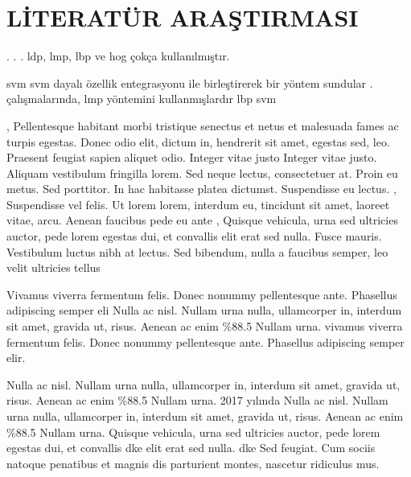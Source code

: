 \chapter{LİTERATÜR ARAŞTIRMASI}

\lipsum[6]
\parencite{shanvd2005}. 
\lipsum[7] 
\parencite{Zhaopaper}. 
\lipsum[5]
\parencite{he_chen}. 
\lipsum[8]
\acrfull{ldp}, \acrfull{lmp}, \acrfull{lbp} ve \acrfull{hog} çokça kullanılmıştır.

\parencite{barlett} 
\lipsum[10]
\acrfull{svm}  \acrfull{svm} dayalı özellik entegrasyonu ile birleştirerek bir yöntem sundular . 
\parencite{mohammad} çalışmalarında, \acrshort{lmp} yöntemini kullanmışlardır
\parencite{SHAN2009}   \acrshort{lbp}  \acrshort{svm} 

\lipsum[11]


\parencite{zhaoandother}, Pellentesque habitant morbi tristique senectus et netus et malesuada fames ac turpis egestas.
\parencite{akyol} Donec odio elit, dictum in, hendrerit sit amet, egestas sed, leo. Praesent feugiat
sapien aliquet odio. Integer vitae justo
\parencite{gacav2018} Integer vitae justo. Aliquam vestibulum fringilla lorem. Sed neque
lectus, consectetuer at.
\parencite{he_chen} Proin eu metus. Sed porttitor. In hac habitasse platea dictumst. Suspendisse eu
lectus.
\parencite{ozbey2018}, Suspendisse vel felis. Ut lorem lorem, interdum eu, tincidunt sit amet, laoreet vitae, arcu. Aenean faucibus pede eu ante
\parencite{akcakoca}, Quisque vehicula, urna sed ultricies auctor, pede lorem egestas dui, et convallis
elit erat sed nulla.
\parencite{bayrakdar2017} Fusce mauris. Vestibulum luctus nibh at lectus. Sed bibendum, nulla a faucibus
semper, leo velit ultricies tellus 

Vivamus viverra fermentum felis. Donec nonummy pellentesque ante. Phasellus
adipiscing semper eli
\parencite{soyeldemirel} Nulla ac nisl. Nullam urna nulla, ullamcorper in, interdum sit amet, gravida ut, risus. Aenean ac enim \%88.5 Nullam urna.
\parencite{Ghimire_2013} vivamus viverra fermentum felis. Donec nonummy pellentesque ante. Phasellus
adipiscing semper elir.  

\parencite{gacav2016} Nulla ac nisl. Nullam urna nulla, ullamcorper in, interdum sit amet, gravida ut, risus. Aenean ac enim \%88.5 Nullam urna.
2017 yılında \parencite{Gacav2017} Nulla ac nisl. Nullam urna nulla, ullamcorper in, interdum sit amet, gravida ut, risus. Aenean ac enim \%88.5 Nullam urna.
\parencite{aksoy2016} Quisque vehicula, urna sed ultricies auctor, pede lorem egestas dui, et convallis
 \acrfull{dke} elit erat sed nulla. \acrshort{dke} Sed feugiat. Cum sociis natoque penatibus et magnis dis parturient montes, nascetur
ridiculus mus.
 
